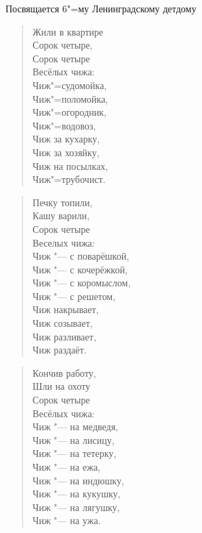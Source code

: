 \begin{flushright}Посвящается 6"=му Ленинградскому детдому \end{flushright}
\begin{verse}
               Жили в квартире \\
               Сорок четыре, \\
               Сорок четыре \\
               Весёлых чижа: \\
               Чиж"=судомойка, \\
               Чиж"=поломойка, \\
               Чиж"=огородник, \\
               Чиж"=водовоз, \\
               Чиж за кухарку,\\ 
               Чиж за хозяйку, \\
               Чиж на посылках, \\
               Чиж"=трубочист. \\
               \end{verse}

\begin{verse}               Печку топили, \\
               Кашу варили, \\
               Сорок четыре \\
               Веселых чижа: \\
               Чиж "--- с поварёшкой, \\
               Чиж "--- с кочерёжкой, \\
               Чиж "--- с коромыслом, \\
               Чиж "--- с решетом, \\
               Чиж накрывает, \\
               Чиж созывает, \\
               Чиж разливает, \\
               Чиж раздаёт. \\ \end{verse}

\begin{verse}               Кончив работу, \\
               Шли на охоту \\
               Сорок четыре \\
               Весёлых чижа: \\
               Чиж "--- на медведя, \\
               Чиж "--- на лисицу, \\
               Чиж "--- на тетерку, \\
               Чиж "--- на ежа, \\
               Чиж "--- на индюшку, \\
               Чиж "--- на кукушку, \\
               Чиж "--- на лягушку, \\
               Чиж "--- на ужа. \\\end{verse}

